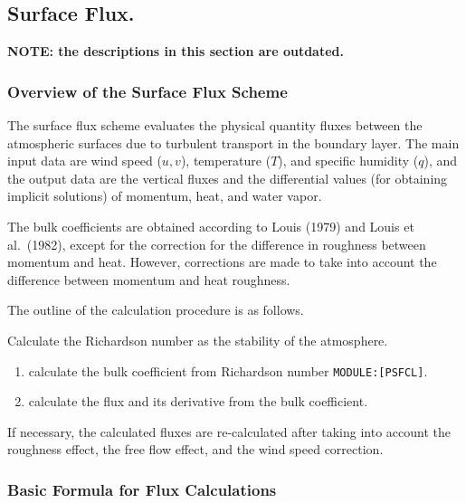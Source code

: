 \hypertarget{surface-flux.}{%
\subsection{Surface Flux.}\label{surface-flux.}}

\textbf{NOTE: the descriptions in this section are outdated.}

\hypertarget{overview-of-the-surface-flux-scheme}{%
\subsubsection{Overview of the Surface Flux
Scheme}\label{overview-of-the-surface-flux-scheme}}

The surface flux scheme evaluates the physical quantity fluxes between
the atmospheric surfaces due to turbulent transport in the boundary
layer. The main input data are wind speed (\(u, v\)), temperature
(\(T\)), and specific humidity (\(q\)), and the output data are the
vertical fluxes and the differential values (for obtaining implicit
solutions) of momentum, heat, and water vapor.

The bulk coefficients are obtained according to Louis (1979) and Louis
et al.~(1982), except for the correction for the difference in roughness
between momentum and heat. However, corrections are made to take into
account the difference between momentum and heat roughness.

The outline of the calculation procedure is as follows.

Calculate the Richardson number as the stability of the atmosphere.

\begin{enumerate}
\def\labelenumi{\arabic{enumi}.}
\item
  calculate the bulk coefficient from Richardson number
  \texttt{MODULE:{[}PSFCL{]}}.
\item
  calculate the flux and its derivative from the bulk coefficient.
\end{enumerate}

If necessary, the calculated fluxes are re-calculated after taking into
account the roughness effect, the free flow effect, and the wind speed
correction.

\hypertarget{basic-formula-for-flux-calculations}{%
\subsubsection{Basic Formula for Flux
Calculations}\label{basic-formula-for-flux-calculations}}

